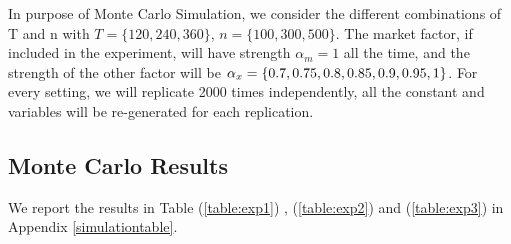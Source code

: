 
In purpose of Monte Carlo Simulation, we consider the different combinations of T and n with $T = \{120, 240, 360\}$, $n =\{100, 300, 500\} $.
The market factor, if included in the experiment, will have strength $\alpha_m = 1$ all the time, and the strength of the other factor will be $\alpha_{x} = \{0.7, 0.75, 0.8,0.85, \\
0.9,0.95, 1\}$. For every setting, we will replicate 2000 times independently, all the constant and variables will be re-generated for each replication.


 
\subsection{Monte Carlo Results}
We report the results in Table (\ref{table:exp1}) , (\ref{table:exp2}) and (\ref{table:exp3}) in Appendix \ref{simulationtable}.

